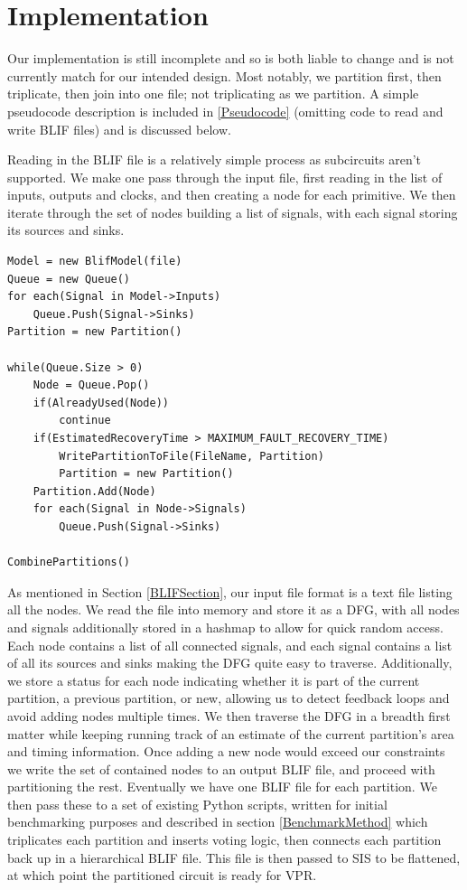 \documentclass[12pt,final,oneside]{memoir} %
\begin{document}
\section{Implementation}
Our implementation is still incomplete and so is both liable to change and is not currently match for   our intended design. Most notably, we partition first, then triplicate, then join into one file; not triplicating as we partition. A simple pseudocode description is included in \ref{Pseudocode} (omitting code to read and write \ac{BLIF} files) and is discussed below.

Reading in the \ac{BLIF} file is a relatively simple process as subcircuits aren't supported. We make one pass through the input file, first reading in the list of inputs, outputs and clocks, and then creating a node for each primitive. We then iterate through the set of nodes building a list of signals, with each signal storing its sources and sinks.

\begin{lstlisting}[caption=Simplified Pseudocode,label=Pseudocode]
Model = new BlifModel(file)
Queue = new Queue()
for each(Signal in Model->Inputs)
    Queue.Push(Signal->Sinks)
Partition = new Partition()

while(Queue.Size > 0)
    Node = Queue.Pop()
    if(AlreadyUsed(Node))
        continue
    if(EstimatedRecoveryTime > MAXIMUM_FAULT_RECOVERY_TIME)
        WritePartitionToFile(FileName, Partition)
        Partition = new Partition()
    Partition.Add(Node)
    for each(Signal in Node->Signals)
        Queue.Push(Signal->Sinks)

CombinePartitions()
\end{lstlisting}

As mentioned in Section \ref{BLIFSection}, our input file format is a text file listing all the nodes. We read the file into memory and store it as a \ac{DFG}, with all nodes and signals additionally stored in a hashmap to allow for quick random access. Each node contains a list of all connected signals, and each signal contains a list of all its sources and sinks making the \ac{DFG} quite easy to traverse. Additionally, we store a status for each node indicating whether it is part of the current partition, a previous partition, or new, allowing us to detect feedback loops and avoid adding nodes multiple times.
We then traverse the \ac{DFG} in a breadth first matter while keeping running track of an estimate of the current partition's area and timing information. Once adding a new node would exceed our constraints we write the set of contained nodes to an output \ac{BLIF} file, and proceed with partitioning the rest. Eventually we have one \ac{BLIF} file for each partition. We then pass these to a set of existing Python scripts, written for initial benchmarking purposes and described in section \ref{BenchmarkMethod} which triplicates each partition and inserts voting logic, then connects each partition back up in a hierarchical \ac{BLIF} file. This file is then passed to \ac{SIS} to be flattened, at which point the partitioned circuit is ready for \ac{VPR}.
\end{document}

